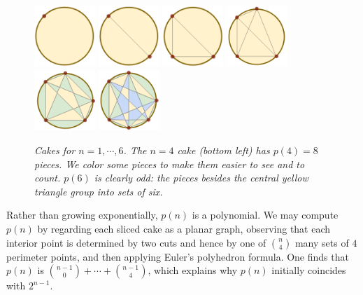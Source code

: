 \documentclass[twocolumn]{article}
\theoremstyle{definition}
\begin{document}
    \begin{figure}[h!]
        \centering
        \includegraphics[height=2.3cm]{cake-1}
        \includegraphics[height=2.3cm]{cake-2}
        \includegraphics[height=2.3cm]{cake-3}
        \includegraphics[height=2.3cm]{cake-4}
        \includegraphics[height=2.3cm]{cake-5-col}
        \includegraphics[height=2.3cm]{cake-6-col}
        \caption{\emph{
            Cakes for $n=1, \cdots, 6$.
            The $n=4$ cake (bottom left) has $p(4)=8$ pieces.  We
            color some pieces to make them easier to see and
            to count.  $p(6)$ is clearly odd: the
            pieces besides the central yellow triangle group into sets
            of six.
        }}
    \end{figure}

    Rather than growing exponentially, $p(n)$ is a polynomial.  
    We may compute $p(n)$ by regarding each sliced cake as a
    planar graph, observing that each interior point is determined by two
    cuts and hence by one of ${n\choose 4}$ many sets of $4$ perimeter
    points, and then applying Euler's polyhedron formula.  One finds that
    $p(n)$ is ${n-1 \choose 0}+\cdots+{n-1\choose 4}$, which explains
    why $p(n)$ initially coincides with $2^{n-1}$.
\end{document}
